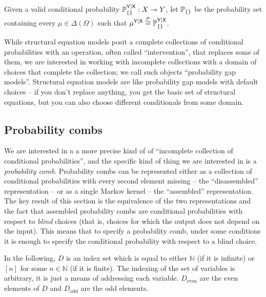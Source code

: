 \begin{definition}
Given a valid conditional probability $\mathbb{P}_{\{\}}^{\mathsf{Y}|\mathsf{X}}:X\rightarrowtriangle Y$, let $\mathbb{P}_{\{\}}$ be the probability set containing every $\mu\in \Delta(\Omega)$ such that $\mu^{\mathsf{Y}|\mathsf{X}}\overset{\mu}{\cong}\mathbb{P}_{\{\}}^{\mathsf{Y}|\mathsf{X}}$.
\end{definition}


While structural equation models posit a complete collections of conditional probabilities with an operation, often called ``intervention'', that replaces some of them, we are interested in working with incomplete collections with a domain of choices that complete the collection; we call such objects ``probability gap models''. Structural equation models are like probability gap models with default choices -- if you don't replace anything, you get the basic set of structural equations, but you can also choose different conditionals from some domain.

\subsection{Probability combs}

We are interested in a a more precise kind of of ``incomplete collection of conditional probabilities'', and the specific kind of thing we are interested in is a \emph{probability comb}. Probability combs can be represented either as a collection of conditional probabilities with every second element missing -- the ``disassembled'' representation -- or as a single Markov kernel -- the ``assembled'' representation. The key result of this section is the equivalence of the two representations and the fact that assembled probability combs are conditional probabilities with respect to \emph{blind} choices (that is, choices for which the output does not depend on the input). This means that to specify a probability comb, under some conditions it is enough to specify the conditional probability with respect to a blind choice.

In the following, $D$ is an index set which is equal to either $\mathbb{N}$ (if it is infinite) or $[n]$ for some $n\in \mathbb{N}$ (if it is finite). The indexing of the set of variables is arbitrary, it is just a means of addressing each variable. $D_{\text{even}}$ are the even elements of $D$ and $D_{\text{odd}}$ are the odd elements.

